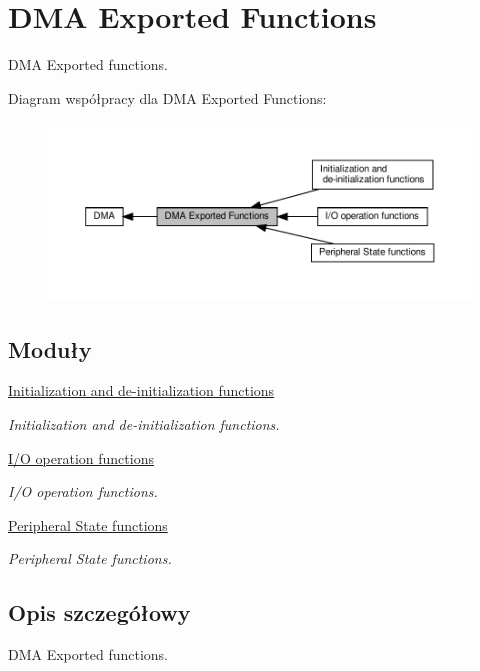 \hypertarget{group___d_m_a___exported___functions}{}\section{D\+MA Exported Functions}
\label{group___d_m_a___exported___functions}


D\+MA Exported functions.  


Diagram współpracy dla D\+MA Exported Functions\+:\nopagebreak
\begin{figure}[H]
\begin{center}
\leavevmode
\includegraphics[width=350pt]{group___d_m_a___exported___functions}
\end{center}
\end{figure}
\subsection*{Moduły}
\begin{DoxyCompactItemize}
\item 
\hyperlink{group___d_m_a___exported___functions___group1}{Initialization and de-\/initialization functions}
\begin{DoxyCompactList}\small\item\em Initialization and de-\/initialization functions. \end{DoxyCompactList}\item 
\hyperlink{group___d_m_a___exported___functions___group2}{I/\+O operation functions}
\begin{DoxyCompactList}\small\item\em I/O operation functions. \end{DoxyCompactList}\item 
\hyperlink{group___d_m_a___exported___functions___group3}{Peripheral State functions}
\begin{DoxyCompactList}\small\item\em Peripheral State functions. \end{DoxyCompactList}\end{DoxyCompactItemize}


\subsection{Opis szczegółowy}
D\+MA Exported functions. 

